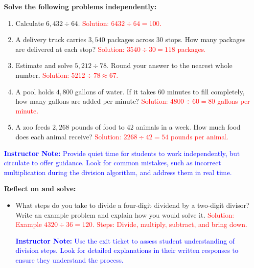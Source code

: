 \documentclass[12pt]{article}
\begin{document}
\vspace{1em}

\begin{tcolorbox}[colframe=black!60, colback=white, 
coltitle=black, colbacktitle=black!15, fonttitle=\bfseries\Large, 
title=Independent Practice, halign title=center, left=10pt, right=10pt, top=10pt, bottom=15pt]
\textbf{Solve the following problems independently:}
\begin{enumerate}[itemsep=3em]
    \item Calculate \( 6,432 \div 64 \). \textcolor{red}{Solution: \( 6432 \div 64 = 100 \).}
    \item A delivery truck carries \( 3,540 \) packages across \( 30 \) stops. How many packages are delivered at each stop? \textcolor{red}{Solution: \( 3540 \div 30 = 118 \) packages.}
    \item Estimate and solve \( 5,212 \div 78 \). Round your answer to the nearest whole number. \textcolor{red}{Solution: \( 5212 \div 78 \approx 67 \).}
    \item A pool holds \( 4,800 \) gallons of water. If it takes \( 60 \) minutes to fill completely, how many gallons are added per minute? \textcolor{red}{Solution: \( 4800 \div 60 = 80 \) gallons per minute.}
    \item A zoo feeds \( 2,268 \) pounds of food to \( 42 \) animals in a week. How much food does each animal receive? \textcolor{red}{Solution: \( 2268 \div 42 = 54 \) pounds per animal.}
\end{enumerate}

\textcolor{blue}{\textbf{Instructor Note:} Provide quiet time for students to work independently, but circulate to offer guidance. Look for common mistakes, such as incorrect multiplication during the division algorithm, and address them in real time.}
\end{tcolorbox}

\vspace{1em}

\begin{tcolorbox}[colframe=black!60, colback=white, 
coltitle=black, colbacktitle=black!15, fonttitle=\bfseries\Large, 
title=Exit Ticket, halign title=center, left=10pt, right=10pt, top=10pt, bottom=15pt]
\textbf{Reflect on and solve:}
\begin{itemize}
    \item What steps do you take to divide a four-digit dividend by a two-digit divisor? Write an example problem and explain how you would solve it. \textcolor{red}{Solution: Example \( 4320 \div 36 = 120 \). Steps: Divide, multiply, subtract, and bring down.}

    \textcolor{blue}{\textbf{Instructor Note:} Use the exit ticket to assess student understanding of division steps. Look for detailed explanations in their written responses to ensure they understand the process.}
\end{itemize}
\end{tcolorbox}
\end{document}
